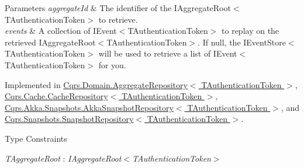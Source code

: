 \begin{DoxyParams}{Parameters}
{\em aggregate\+Id} & The identifier of the I\+Aggregate\+Root$<$\+T\+Authentication\+Token$>$ to retrieve.\\
\hline
{\em events} & A collection of I\+Event$<$\+T\+Authentication\+Token$>$ to replay on the retrieved I\+Aggregate\+Root$<$\+T\+Authentication\+Token$>$. If null, the I\+Event\+Store$<$\+T\+Authentication\+Token$>$ will be used to retrieve a list of I\+Event$<$\+T\+Authentication\+Token$>$ for you. \\
\hline
\end{DoxyParams}


Implemented in \hyperlink{classCqrs_1_1Domain_1_1AggregateRepository_a0e55881812d463129df34189d29544b6_a0e55881812d463129df34189d29544b6}{Cqrs.\+Domain.\+Aggregate\+Repository$<$ T\+Authentication\+Token $>$}, \hyperlink{classCqrs_1_1Cache_1_1CacheRepository_a037acba636aedf23ff376ac0b749ec0c_a037acba636aedf23ff376ac0b749ec0c}{Cqrs.\+Cache.\+Cache\+Repository$<$ T\+Authentication\+Token $>$}, \hyperlink{classCqrs_1_1Akka_1_1Snapshots_1_1AkkaSnapshotRepository_a953067de4f1ed8c4528e92bf896fbf79_a953067de4f1ed8c4528e92bf896fbf79}{Cqrs.\+Akka.\+Snapshots.\+Akka\+Snapshot\+Repository$<$ T\+Authentication\+Token $>$}, and \hyperlink{classCqrs_1_1Snapshots_1_1SnapshotRepository_acdbea47afc87de1da613a6eff3ceef0f_acdbea47afc87de1da613a6eff3ceef0f}{Cqrs.\+Snapshots.\+Snapshot\+Repository$<$ T\+Authentication\+Token $>$}.

\begin{Desc}
\item[Type Constraints]\begin{description}
\item[{\em T\+Aggregate\+Root} : {\em I\+Aggregate\+Root$<$T\+Authentication\+Token$>$}]\end{description}
\end{Desc}
\mbox{\label{interfaceCqrs_1_1Domain_1_1IAggregateRepository_a32308a27ce03c5d406e16b17430dd040_a32308a27ce03c5d406e16b17430dd040}} 
